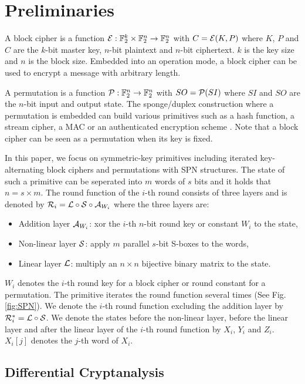 \section{Preliminaries\label{sec:pre}}

A block cipher is a function $\mathcal{E}:\mathbb{F}_2^k \times \mathbb{F}_2^n \rightarrow \mathbb{F}_2^n$ with $C=\mathcal{E}(K,P)$ where $K$, $P$ and $C$ are the $k$-bit master key, $n$-bit plaintext and $n$-bit ciphertext. $k$ is the key size and $n$ is the block size. Embedded into an operation mode, a block cipher can be used to encrypt a message with arbitrary length. 

A permutation is a function $\mathcal{P}:\mathbb{F}_2^n \rightarrow \mathbb{F}_2^n$ with $SO=\mathcal{P}(SI)$ where $SI$ and $SO$ are the $n$-bit input and output state. The sponge/duplex construction where a permutation is embedded can build various primitives such as a hash function, a stream cipher, a MAC or an authenticated encryption scheme \cite{bertoni2007sponge}. Note that a block cipher can be seen as a permutation when its key is fixed.

In this paper, we focus on symmetric-key primitives including iterated key-alternating block ciphers and permutations with SPN structures. The state of such a primitive can be seperated into $m$ words of $s$ bits and it holds that $n=s\times m$. The round function of the $i$-th round consists of three layers and is denoted by $\mathcal{R}_i=\mathcal{L}\circ\mathcal{S}\circ\mathcal{A}_{W_i}$ where the three layers are:
\begin{itemize}
    \item Addition layer $\mathcal{A}_{W_i}$: xor the $i$-th $n$-bit round key or constant $W_i$ to the state,
    \item Non-linear layer $\mathcal{S}$: apply $m$ parallel $s$-bit S-boxes to the words,
    \item Linear layer $\mathcal{L}$: multiply an $n\times n$ bijective binary matrix to the state. 
\end{itemize}

$W_i$ denotes the $i$-th round key for a block cipher or round constant for a permutation. The primitive iterates the round function several times (See Fig. \ref{fig:SPN}). We denote the $i$-th round function excluding the addition layer by $\mathcal{R}_i^*=\mathcal{L}\circ\mathcal{S}$. We denote the states before the non-linear layer, before the linear layer and after the linear layer of the $i$-th round function by $X_i$, $Y_i$ and $Z_i$. $X_i[j]$ denotes the $j$-th word of $X_i$. 

\subsection{Differential Cryptanalysis}

